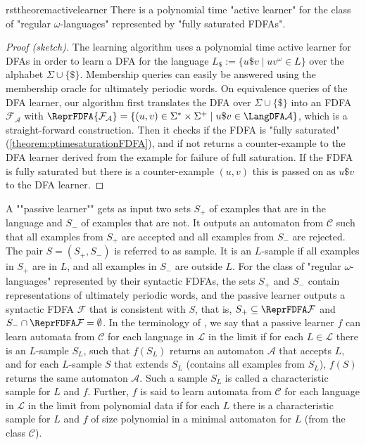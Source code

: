 \documentclass[a4paper,USenglish,cleveref,autoref,thm-restate]{lipics-v2021}
\newcommand{\mc}[1]{\ensuremath{\mathcal{#1}}}
\newcommand{\A}{\mc{A}}
\newcommand{\F}{\mc{F}}
\newcommand{\C}{\mc{C}}
\renewcommand{\L}{\mc{L}}
\begin{document}
\begin{restatable}{rsttheorem}{activelearner}
There is a polynomial time "active learner" for the class of "regular $\omega$-languages" represented by "fully saturated FDFAs".
\label{theorem:activelearner}
\end{restatable}
\begin{proof}[Proof (sketch)]
  The learning algorithm uses a polynomial time active learner for DFAs in order to learn a DFA for the language $L_\$ := \{u\$v \mid uv^\omega \in L\}$ over the alphabet $\Sigma \cup \{\$\}$. Membership queries can easily be answered using the membership oracle for ultimately periodic words. On equivalence queries of the DFA learner, our algorithm first translates the DFA over $\Sigma \cup \{\$\}$ into an FDFA $\F_\A$ with $\ReprFDFA{\F_\A} = \{(u,v) \in \Sigma^* \times \Sigma^+ \mid u\$v \in \LangDFA\A\}$, which is a straight-forward construction. 
  Then it checks if the FDFA is "fully saturated" (\cref{theorem:ptimesaturationFDFA}), and if not returns a counter-example to the DFA learner derived from the example for failure of full saturation.
  If the FDFA is fully saturated but there is a counter-example $(u,v)$ this is passed on as $u\$v$ to the DFA learner. 
\end{proof}

A ""passive learner"" gets as input two sets $S_+$ of examples that are in the language and $S_-$ of examples that are not. It outputs an automaton from $\C$ such that all examples from $S_+$ are accepted and all examples from $S_-$ are rejected. The pair $S = (S_+,S_-)$ is referred to as sample. It is an $L$-sample if all examples in $S_+$ are in $L$, and all examples in $S_-$ are outside $L$. For the class of "regular $\omega$-languages" represented by their syntactic FDFAs, the sets $S_+$ and $S_-$ contain representations of ultimately periodic words, and the passive learner outputs a syntactic FDFA $\F$ that is consistent with $S$, that is, $S_+ \subseteq \ReprFDFA\F$ and $S_- \cap \ReprFDFA\F = \emptyset$.
In the terminology of \cite{Gold78}, we say that a passive learner $f$ can learn automata from $\C$ for each language in $\L$ in the limit if for each $L \in \L$ there is an $L$-sample $S_L$, such that $f(S_L)$ returns an automaton $\A$ that accepts $L$, and for each $L$-sample $S$ that extends $S_L$ (contains all examples from $S_L$), $f(S)$ returns the same automaton $\A$. Such a sample $S_L$ is called a characteristic sample for $L$ and $f$. Further, $f$ is said to learn automata from $\C$ for each language in $\L$ in the limit from polynomial data if for each $L$ there is a characteristic sample for $L$ and $f$ of size polynomial in a minimal automaton for $L$ (from the class $\C$).
\end{document}
